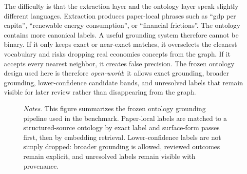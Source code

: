 \documentclass[11pt]{article}
\newcommand{\fignotes}[1]{\caption*{\textit{Notes.} #1}}
\begin{document}
The difficulty is that the extraction layer and the ontology layer speak slightly different
languages. Extraction produces paper-local phrases such as ``gdp per capita'',
``renewable energy consumption'', or ``financial frictions''. The ontology contains more
canonical labels. A useful grounding system therefore cannot be binary. If it only keeps
exact or near-exact matches, it overselects the cleanest vocabulary and risks dropping real
economics concepts from the graph. If it accepts every nearest neighbor, it creates false
precision. The frozen ontology design used here is therefore \emph{open-world}: it allows
exact grounding, broader grounding, lower-confidence candidate bands, and unresolved labels
that remain visible for later review rather than disappearing from the graph.

\begin{figure}[t]
  \caption{Node normalization and concept matching}
  \label{fig:normalization-flow}
  \centering
  \fignotes{This figure summarizes the frozen ontology grounding pipeline used in the benchmark. Paper-local labels are matched to a structured-source ontology by exact label and surface-form passes first, then by embedding retrieval. Lower-confidence labels are not simply dropped: broader grounding is allowed, reviewed outcomes remain explicit, and unresolved labels remain visible with provenance.}
\end{figure}
\end{document}
